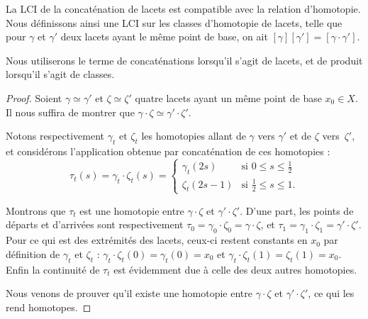 \begin{proposition}
La LCI de la concaténation de lacets est compatible avec la relation d'homotopie. Nous définissons ainsi une LCI sur les classes d'homotopie de lacets, telle que pour $\gamma$ et $\gamma'$ deux lacets ayant le même point de base, on ait $[\gamma][\gamma']=[\gamma\cdot\gamma']$.
\end{proposition}


Nous utiliserons le terme de concaténations lorsqu'il s'agit de lacets, et de produit lorsqu'il s'agit de classes.


\begin{proof}
Soient $\gamma\simeq\gamma'$ et $\zeta\simeq\zeta'$ quatre lacets ayant un même point de base $x_0\in X$. Il nous suffira de montrer que $\gamma\cdot\zeta\simeq\gamma'\cdot\zeta'$.

Notons respectivement $\gamma_t$ et $\zeta_t$ les homotopies allant de $\gamma$ vers $\gamma'$ et de $\zeta$ vers~$\zeta'$, et considérons l'application obtenue par concaténation de ces homotopies : \begin{equation}\label{eq:homotopy-concatenate}
\tau_t(s)=\gamma_t\cdot\zeta_t(s)=\left\{\begin{matrix}
\gamma_t(2s)&\text{si }0\leq s\leq \frac{1}{2}\\ 
\zeta_t(2s-1)&\text{si }\frac{1}{2}\leq s\leq 1.
\end{matrix}\right.
\end{equation}

Montrons que $\tau_t$ est une homotopie entre $\gamma\cdot\zeta$ et $\gamma'\cdot\zeta'$. D'une part, les points de départs et d'arrivées sont respectivement $\tau_0=\gamma_0\cdot\zeta_0=\gamma\cdot\zeta$, et $\tau_1=\gamma_1\cdot\zeta_1=\gamma'\cdot\zeta'$. Pour ce qui est des extrémités des lacets, ceux-ci restent constants en $x_0$ par définition de $\gamma_t$ et $\zeta_t$ : $\gamma_t\cdot\zeta_t(0)=\gamma_t(0)=x_0$ et $\gamma_t\cdot\zeta_t(1)=\zeta_t(1)=x_0$. Enfin la continuité de $\tau_t$ est évidemment due à celle des deux autres homotopies.

Nous venons de prouver qu'il existe une homotopie entre $\gamma\cdot\zeta$ et $\gamma'\cdot\zeta'$, ce qui les rend homotopes.
\end{proof}

